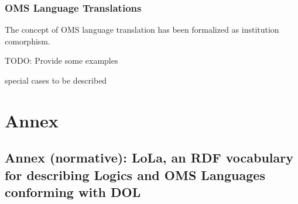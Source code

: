 \documentclass[10pt,fleqn,%
\ifpretendfinal
final%
\else
draft%
\fi,
]{scrreprt}
\makeatletter
\newcommand*\CommentAuthor{}
\renewcommand*\CommentAuthor{#1}}
\newcommand*\CommentDate{}
\renewcommand*\CommentDate{#1}}
\newcommand*\CommentId{}
\renewcommand*\CommentId{#1}}
\newcommand*\CommentType{}
\renewcommand*\CommentType{#1}}
\newcommand*{\SetCommentColorByType}[1]{%
\edef\localType{{#1}}%
\expandafter\ifstrequal\localType{q-aut}{\colorlet{CommentColor}{red}}{%
\expandafter\ifstrequal\localType{q-all}{\colorlet{CommentColor}{orange}}{%
\expandafter\ifstrequal\localType{todo}{\colorlet{CommentColor}{orange}}{%
\expandafter\ifstrequal\localType{fyi}{\colorlet{CommentColor}{lightgray}}{%
\colorlet{CommentColor}{yellow}}}}}}
\newcommand*{\SetCommentPrefixByType}[1]{%
\edef\localType{{#1}}%
\expandafter\@ifmtarg\localType{%
\edef\CommentPrefix{}%
}{%
\caseupper[q]{#1}%
\edef\CommentPrefix{\thestring: }%
}}
\newcommand*{\initComment}[1]{%
\setkeys{Comment}{#1}%
\SetCommentColorByType{\CommentType}%
\relax%
\SetCommentPrefixByType{\CommentType}%
\relax%
}
\newcommand*{\todonote}[2][]{%
\initComment{#1}%
\pdfcomment[author=\CommentAuthor,color=CommentColor,date=\CommentDate,id=\CommentId]{%
\CommentPrefix
#2}}
\renewcommand*{\todonote}[2][]{%
\initComment{#1}%
\ednote{\CommentPrefix #2}}
\newcommand*{\CL}{\ensuremath{\mathsf{CL}}\xspace}
\newcommand{\sclause}[1]{\section{#1}}
\makeatother
\begin{document}
%
%



\sclause{OMS Language Translations}
The concept of OMS language translation has been
formalized as institution comorphism.

TODO: Provide some examples

special cases to be described


\part*{Annex}

\appendix

\chapter[LoLa RDF Vocabulary]{Annex (normative): LoLa, an RDF vocabulary for describing Logics and OMS Languages conforming with DOL}\label{a:lola}
\end{document}
